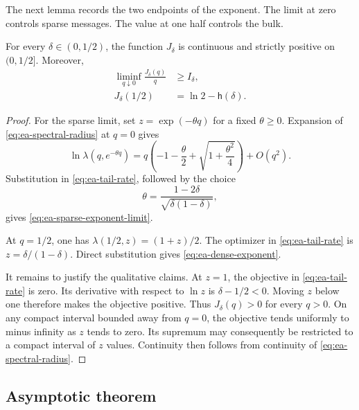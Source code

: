 The next lemma records the two endpoints of the exponent.  The limit at zero
controls sparse messages.  The value at one half controls the bulk.

\begin{lemma}
\label{lem:ea-endpoint-exponents}
For every $\delta\in(0,1/2)$, the function $J_\delta$ is continuous and
strictly positive on $(0,1/2]$.  Moreover,
\begin{align}
 \liminf_{q\downarrow 0}\frac{J_\delta(q)}{q}
 &\geq I_\delta,
 \label{eq:ea-sparse-exponent-limit}\\
 J_\delta(1/2)
 &=\ln 2-\mathsf{h}(\delta).
 \label{eq:ea-dense-exponent}
\end{align}
\end{lemma}

\begin{proof}
For the sparse limit, set $z=\exp(-\theta q)$ for a fixed $\theta\geq 0$.
Expansion of \eqref{eq:ea-spectral-radius} at $q=0$ gives
\begin{equation}
 \ln\lambda(q,e^{-\theta q})
 =q\left(-1-\frac{\theta}{2}
   +\sqrt{1+\frac{\theta^2}{4}}\right)+O(q^2).
 \label{eq:ea-sparse-spectral-expansion}
\end{equation}
Substitution in \eqref{eq:ea-tail-rate}, followed by the choice
\begin{equation}
 \theta=\frac{1-2\delta}{\sqrt{\delta(1-\delta)}},
 \label{eq:ea-sparse-theta}
\end{equation}
gives \eqref{eq:ea-sparse-exponent-limit}.

At $q=1/2$, one has $\lambda(1/2,z)=(1+z)/2$.  The optimizer in
\eqref{eq:ea-tail-rate} is $z=\delta/(1-\delta)$.  Direct substitution gives
\eqref{eq:ea-dense-exponent}.

It remains to justify the qualitative claims.  At $z=1$, the objective in
\eqref{eq:ea-tail-rate} is zero.  Its derivative with respect to $\ln z$ is
$\delta-1/2<0$.  Moving $z$ below one therefore makes the objective positive.
Thus $J_\delta(q)>0$ for every $q>0$.  On any compact interval bounded away
from $q=0$, the objective tends uniformly to minus infinity as $z$ tends to
zero.  Its supremum may consequently be restricted to a compact interval of
$z$ values.  Continuity then follows from continuity of
\eqref{eq:ea-spectral-radius}.
\end{proof}

\subsection{Asymptotic theorem}

